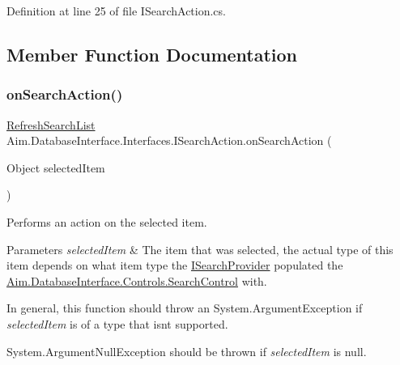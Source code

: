 Definition at line 25 of file I\+Search\+Action.\+cs.



\subsection{Member Function Documentation}
\mbox{\label{interface_aim_1_1_database_interface_1_1_interfaces_1_1_i_search_action_ab23ff488687e962a6806ee8d0f91560c}} 
\subsubsection{\texorpdfstring{on\+Search\+Action()}{onSearchAction()}}
{\footnotesize\ttfamily \mbox{\hyperlink{namespace_aim_1_1_database_interface_1_1_interfaces_aafb04e83cb5c64ff04eaca9a548186eb}{Refresh\+Search\+List}} Aim.\+Database\+Interface.\+Interfaces.\+I\+Search\+Action.\+on\+Search\+Action (\begin{DoxyParamCaption}\item[{Object}]{selected\+Item }\end{DoxyParamCaption})}



Performs an action on the selected item. 


\begin{DoxyParams}{Parameters}
{\em selected\+Item} & The item that was selected, the actual type of this item depends on what item type the \mbox{\hyperlink{interface_aim_1_1_database_interface_1_1_interfaces_1_1_i_search_provider}{I\+Search\+Provider}} populated the \mbox{\hyperlink{class_aim_1_1_database_interface_1_1_controls_1_1_search_control}{Aim.\+Database\+Interface.\+Controls.\+Search\+Control}} with.\\
\hline
\end{DoxyParams}
In general, this function should throw an System.\+Argument\+Exception if {\itshape selected\+Item}  is of a type that isn\textquotesingle{}t supported.

System.\+Argument\+Null\+Exception should be thrown if {\itshape selected\+Item}  is null. 


